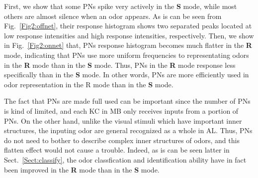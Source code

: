 \documentclass[12pt, a4paper]{article}
\begin{document}
First, we show that some PNs spike very actively in the {\bf{S}} mode, while most others are almost silence when an odor appears. As is can be seen from Fig.~\ref{Fig2:offnet}, their response histogram shows two separated peaks located at low response intensities and high response intensities, respectively. Then, we show in Fig.~\ref{Fig2:onnet} that, PNs response histogram becomes much flatter in the {\bf{R}} mode, indicating that PNs use more uniform frequencies to representating odors in the {\bf R} mode than in the {\bf S} mode.
Thus, PNs in the {\bf R} mode response less specifically than in the {\bf S} mode. In other words, PNs are more efficiently used in odor representation in the {\mf R} mode than in the {\bf S} mode.

The fact that PNs are made full used can be important since the number of PNs is kind of limited, and each KC in MB only receives inputs from a portion of PNs. %
On the other hand, unlike the visual stimuli which have important inner structures, the inputing odor are general recognized as a whole in AL. Thus, PNs do not need to bother to describe complex inner structures of odors, and this flatten effect would not cause a trouble. Indeed, as is can be seen latter in Sect.~\ref{Sect:classify}, the odor classfication and identification ability have in fact been improved in the {\bf R} mode than in the {\bf S} mode.


\end{document}
